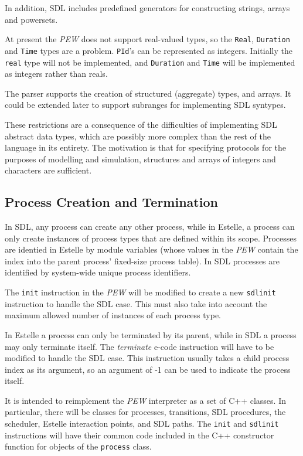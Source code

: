In addition, SDL includes predefined generators for constructing
strings, arrays and powersets.

At present the {\em PEW} does not support real-valued types, so
the {\tt Real}, {\tt Duration} and {\tt Time} types are a problem.
{\tt PId}'s can be represented as integers.
Initially the {\tt real} type will not be implemented,
and {\tt Duration} and {\tt Time} will be implemented as
integers rather than reals. 

The parser supports the creation of structured (aggregate) types,
and arrays. 
It could be extended later to support subranges for implementing SDL syntypes.

These restrictions are a consequence of the difficulties of
implementing SDL abstract data types, which are possibly more complex 
than the rest of the language in its entirety. 
The motivation is that for specifying protocols for the purposes
of modelling and simulation, structures and arrays of integers 
and characters are sufficient.

\subsection{Process Creation and Termination}

In SDL, any process can create any other process, while in Estelle, 
a process can only create instances of process types that are defined
within its scope. 
Processes are identied in Estelle by module
variables (whose values in the {\em PEW} contain the index into
the parent process' fixed-size process table).
In SDL processes are identified by system-wide unique process
identifiers.

The {\tt init} instruction in the {\em PEW} will be modified
to create a new {\tt sdlinit} instruction to handle the SDL case.
This must also take into account the maximum allowed number of 
instances of each process type.

In Estelle a process can only be terminated by its parent, while in
SDL a process may only terminate itself. 
The {\em terminate} e-code instruction will have to be modified to 
handle the SDL case.
This instruction usually takes a child process index as its argument,
so an argument of -1 can be used to indicate the process itself.

It is intended to reimplement the {\em PEW} interpreter as a set of
C++ classes.
In particular, there will be classes for processes, transitions,
SDL procedures, the scheduler, Estelle interaction points, and SDL
paths.
The {\tt init} and {\tt sdlinit} instructions will have their
common code included in the C++ constructor function for objects of
the {\tt process} class.

